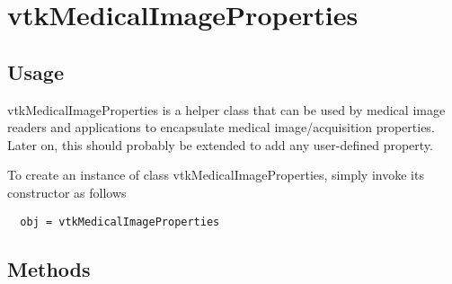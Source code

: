 \section{vtkMedicalImageProperties}

\subsection{Usage}

 vtkMedicalImageProperties is a helper class that can be used by medical
 image readers and applications to encapsulate medical image/acquisition
 properties. Later on, this should probably be extended to add
 any user-defined property.

To create an instance of class vtkMedicalImageProperties, simply
invoke its constructor as follows
\begin{verbatim}
  obj = vtkMedicalImageProperties
\end{verbatim}
\subsection{Methods}

